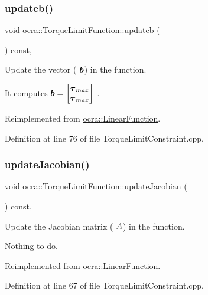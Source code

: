 \subsubsection{\texorpdfstring{updateb()}{updateb()}}
{\footnotesize\ttfamily void ocra\+::\+Torque\+Limit\+Function\+::updateb (\begin{DoxyParamCaption}{ }\end{DoxyParamCaption}) const\hspace{0.3cm}{\ttfamily [protected]}, {\ttfamily [virtual]}}

Update the vector ( $ \mbox{\boldmath${b}$} $) in the function.

It computes $ \mbox{\boldmath${b}$} = \begin{bmatrix} \mbox{\boldmath${\tau}$}_{max} \\ \mbox{\boldmath${\tau}$}_{max} \end{bmatrix} $ . 

Reimplemented from \hyperlink{classocra_1_1LinearFunction_a546454cd8d0909f99433ffc0e700c9e3}{ocra\+::\+Linear\+Function}.



Definition at line 76 of file Torque\+Limit\+Constraint.\+cpp.

\hypertarget{classocra_1_1TorqueLimitFunction_ad33a9f6f6af6edd6b3c0cda6f915336b}{}\label{classocra_1_1TorqueLimitFunction_ad33a9f6f6af6edd6b3c0cda6f915336b} 
\subsubsection{\texorpdfstring{update\+Jacobian()}{updateJacobian()}}
{\footnotesize\ttfamily void ocra\+::\+Torque\+Limit\+Function\+::update\+Jacobian (\begin{DoxyParamCaption}{ }\end{DoxyParamCaption}) const\hspace{0.3cm}{\ttfamily [protected]}, {\ttfamily [virtual]}}

Update the Jacobian matrix ( $ A $) in the function.

Nothing to do. 

Reimplemented from \hyperlink{classocra_1_1LinearFunction_a30926f977c0124a0b0f65b854ab39636}{ocra\+::\+Linear\+Function}.



Definition at line 67 of file Torque\+Limit\+Constraint.\+cpp.



